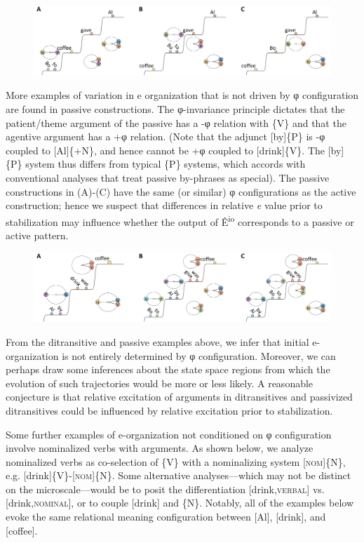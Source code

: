   
\begin{figure}
\includegraphics[width=\textwidth]{figures/Tilsen-img80.png}
\caption{\missingcaption}
\label{fig:4:30}
\end{figure}
 

  More examples of variation in e organization that is not driven by φ configuration are found in passive constructions. The φ-invariance principle dictates that the patient/theme argument of the passive has a -φ relation with \{V\} and that the agentive argument has a +φ relation. (Note that the adjunct [by]\{P\} is -φ coupled to [Al]\{+N\}, and hence cannot be +φ coupled to [drink]\{V\}. The [by]\{P\} system thus differs from typical \{P\} systems, which accords with conventional analyses that treat passive by-phrases as special). The passive constructions in (A)-(C) have the same (or similar) φ configurations as the active construction; hence we suspect that differences in relative \textit{e} value prior to stabilization may influence whether the output of Ê\textsuperscript{io} corresponds to a passive or active pattern.

  
\begin{figure}
\includegraphics[width=\textwidth]{figures/Tilsen-img81.png}
\caption{\missingcaption}
\label{fig:4:31}
\end{figure}
 

  From the ditransitive and passive examples above, we infer that initial e-organization is not entirely determined by φ configuration. Moreover, we can perhaps draw some inferences about the state space regions from which the evolution of such trajectories would be more or less likely. A reasonable conjecture is that relative excitation of arguments in ditransitives and passivized ditransitives could be influenced by relative excitation prior to stabilization.

  Some further examples of e-organization not conditioned on φ configuration involve nominalized verbs with arguments. As shown below, we analyze nominalized verbs as co-selection of \{V\} with a nominalizing system [\textsc{nom}]\{N\}, e.g. [drink]\{V\}-[\textsc{nom}]\{\textsc{N}\}. Some alternative analyses—which may not be distinct on the microscale—would be to posit the differentiation [drink,\textsc{verbal}] vs. [drink,\textsc{nominal}], or to couple [drink] and \{N\}. Notably, all of the examples below evoke the same relational meaning configuration between [Al], [drink], and [coffee].

